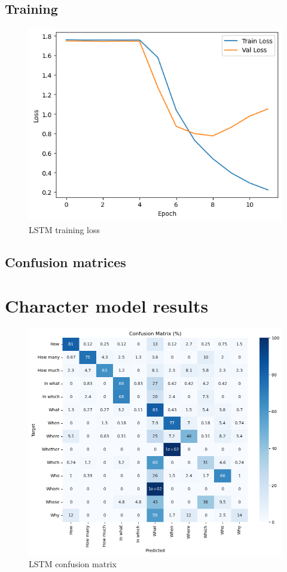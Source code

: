 \documentclass{article}
\begin{document}
\subsection{Training}

\begin{figure}[ht]
    \centering
    \includegraphics[width=0.8\linewidth]{results/classification/lstm loss.png}
    \caption{LSTM training loss}
    \label{fig:lstm-loss}
\end{figure}

\subsection{Confusion matrices}

\section{Character model results}


\begin{figure}[ht]
    \centering
    \includegraphics[width=0.75\linewidth]{results/classification/lstm conf.png}
    \caption{LSTM confusion matrix}
    \label{fig:lstm-conf}
\end{figure}
\end{document}
